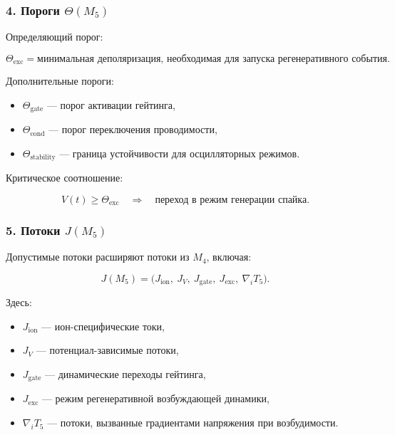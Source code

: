 \subsubsection*{4. Пороги \texorpdfstring{$\Theta(M_5)$}{\Theta(M_5)}}

Определяющий порог:

\[
\Theta_{\mathrm{exc}} = \text{минимальная деполяризация, необходимая для запуска регенеративного события}.
\]

Дополнительные пороги:

\begin{itemize}
    \item $\Theta_{\mathrm{gate}}$ — порог активации гейтинга,
    \item $\Theta_{\mathrm{cond}}$ — порог переключения проводимости,
    \item $\Theta_{\mathrm{stability}}$ — граница устойчивости для осцилляторных режимов.
\end{itemize}

Критическое соотношение:

\[
V(t) \ge \Theta_{\mathrm{exc}} \quad\Rightarrow\quad
\text{переход в режим генерации спайка}.
\]

\subsubsection*{5. Потоки \texorpdfstring{$J(M_5)$}{J(M_5)}}

Допустимые потоки расширяют потоки из $M_4$, включая:

\[
J(M_5) =
\big(
J_{\mathrm{ion}},\
J_V,\
J_{\mathrm{gate}},\
J_{\mathrm{exc}},\
\nabla_i T_5
\big).
\]

Здесь:

\begin{itemize}
    \item $J_{\mathrm{ion}}$ — ион-специфические токи,
    \item $J_V$ — потенциал-зависимые потоки,
    \item $J_{\mathrm{gate}}$ — динамические переходы гейтинга,
    \item $J_{\mathrm{exc}}$ — режим регенеративной возбуждающей динамики,
    \item $\nabla_i T_5$ — потоки, вызванные градиентами напряжения при возбудимости.
\end{itemize}

